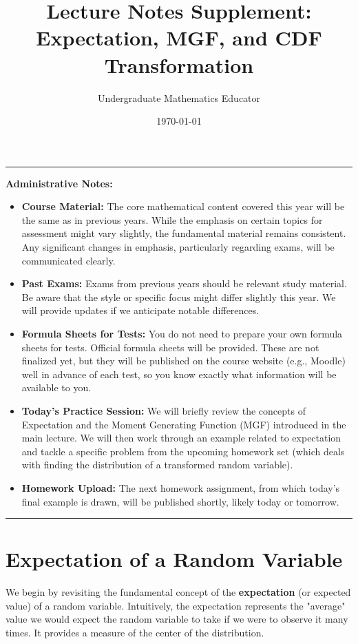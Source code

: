 \documentclass[11pt]{article}
\title{Lecture Notes Supplement: Expectation, MGF, and CDF Transformation}
\author{Undergraduate Mathematics Educator} %
\date{\today}
\theoremstyle{definition}
\theoremstyle{remark}
\newenvironment{adminnotes}
  {\par\medskip\noindent\begin{minipage}{\textwidth}\hrule\medskip\textbf{Administrative Notes:}\begin{itemize}}
  {\end{itemize}\medskip\hrule\end{minipage}\par\medskip}
\begin{document}
\maketitle

\begin{adminnotes}
    \item \textbf{Course Material:} The core mathematical content covered this year will be the same as in previous years. While the emphasis on certain topics for assessment might vary slightly, the fundamental material remains consistent. Any significant changes in emphasis, particularly regarding exams, will be communicated clearly.
    \item \textbf{Past Exams:} Exams from previous years should be relevant study material. Be aware that the style or specific focus might differ slightly this year. We will provide updates if we anticipate notable differences.
    \item \textbf{Formula Sheets for Tests:} You do not need to prepare your own formula sheets for tests. Official formula sheets will be provided. These are not finalized yet, but they will be published on the course website (e.g., Moodle) well in advance of each test, so you know exactly what information will be available to you.
    \item \textbf{Today's Practice Session:} We will briefly review the concepts of Expectation and the Moment Generating Function (MGF) introduced in the main lecture. We will then work through an example related to expectation and tackle a specific problem from the upcoming homework set (which deals with finding the distribution of a transformed random variable).
    \item \textbf{Homework Upload:} The next homework assignment, from which today's final example is drawn, will be published shortly, likely today or tomorrow.
\end{adminnotes}

\section{Expectation of a Random Variable}

We begin by revisiting the fundamental concept of the \textbf{expectation} (or expected value) of a random variable. Intuitively, the expectation represents the "average" value we would expect the random variable to take if we were to observe it many times. It provides a measure of the center of the distribution.
\end{document}
